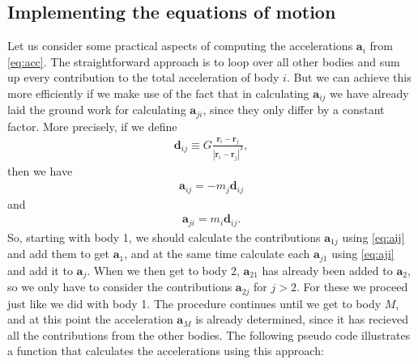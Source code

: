 \documentclass{article}
\newcommand{\mb}[1]{\mathbf{#1}}
\begin{document}
\subsection{Implementing the equations of motion} \label{section:ieom}
Let us consider some practical aspects of computing the accelerations $\mb{a}_i$ from \eqref{eq:acc}. The straightforward approach is to loop over all other bodies and sum up every contribution to the total acceleration of body $i$. But we can achieve this more efficiently if we make use of the fact that in calculating $\mb{a}_{ij}$ we have already laid the ground work for calculating $\mb{a}_{ji}$, since they only differ by a constant factor. More precisely, if we define
\begin{align*}
    \mb{d}_{ij} \equiv G \frac{\mb{r}_i - \mb{r}_j}{{|\mb{r}_i - \mb{r}_j|}^3},
\end{align*}
then we have
\begin{align}
    \mb{a}_{ij} = -m_j \mb{d}_{ij} \label{eq:aij}
\end{align}
and
\begin{align}
    \mb{a}_{ji} = m_i \mb{d}_{ij}. \label{eq:aji}
\end{align}
So, starting with body 1, we should calculate the contributions $\mb{a}_{1j}$ using \eqref{eq:aij} and add them to get $\mb{a}_1$, and at the same time calculate each $\mb{a}_{j1}$ using \eqref{eq:aji} and add it to $\mb{a}_j$. When we then get to body 2, $\mb{a}_{21}$ has already been added to $\mb{a}_2$, so we only have to consider the contributions $\mb{a}_{2j}$ for $j > 2$. For these we proceed just like we did with body 1. The procedure continues until we get to body $M$, and at this point the acceleration $\mb{a}_M$ is already determined, since it has recieved all the contributions from the other bodies. The following pseudo code illustrates a function that calculates the accelerations using this approach:\\\\
\end{document}

